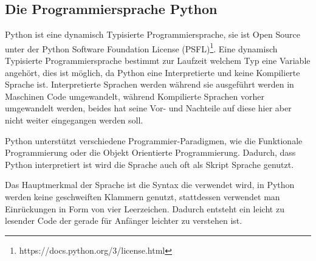\subsection{Die Programmiersprache Python}\label{einleitung:python}

Python ist eine dynamisch Typisierte Programmiersprache, sie ist Open Source unter der
Python Software Foundation License (PSFL)\footnote{https://docs.python.org/3/license.html}.
Eine dynamisch Typisierte Programmiersprache bestimmt zur Laufzeit welchem Typ eine Variable
angehört, dies ist möglich, da Python eine Interpretierte und keine Kompilierte Sprache ist.
Interpretierte Sprachen werden während sie ausgeführt werden in Maschinen Code umgewandelt,
während Kompilierte Sprachen vorher umgewandelt werden, beides hat seine Vor- und Nachteile
auf diese hier aber nicht weiter eingegangen werden soll.

Python unterstützt verschiedene Programmier-Paradigmen, wie die Funktionale Programmierung oder
die Objekt Orientierte Programmierung. Dadurch, dass Python interpretiert ist wird die Sprache
auch oft als Skript Sprache genutzt.

Das Hauptmerkmal der Sprache ist die Syntax die verwendet wird, in Python werden keine geschweiften
Klammern genutzt, stattdessen verwendet man Einrückungen in Form von vier Leerzeichen. Dadurch entsteht
ein leicht zu lesender Code der gerade für Anfänger leichter zu verstehen ist.
